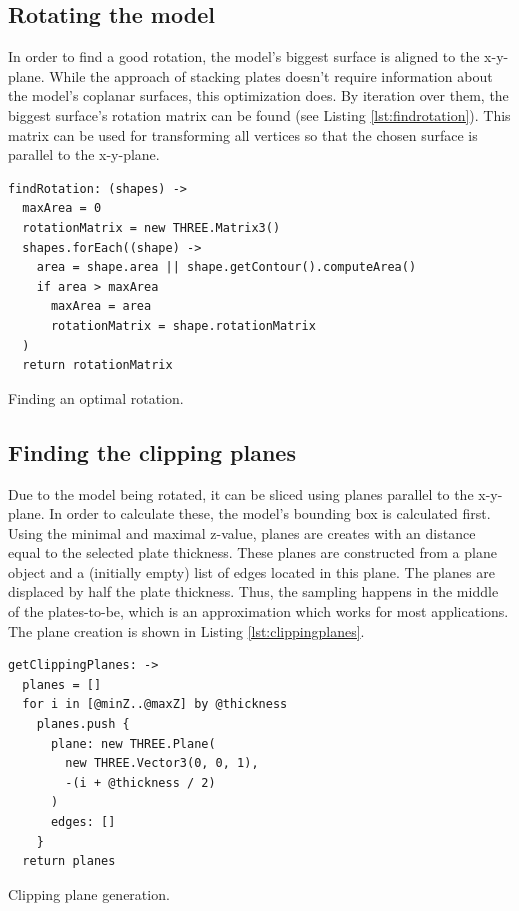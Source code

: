 \documentclass[../ClassicThesis.tex]{subfiles}
\begin{document}
\subsection{Rotating the model}

In order to find a good rotation, the model's biggest surface is aligned to the x-y-plane. While the approach of stacking plates doesn't require information about the model's coplanar surfaces, this optimization does. By iteration over them, the biggest surface's rotation matrix can be found (see Listing \ref{lst:findrotation}). This matrix can be used for transforming all vertices so that the chosen surface is parallel to the x-y-plane.

\begin{listing}[ht]
\begin{verbatim}
findRotation: (shapes) ->
  maxArea = 0
  rotationMatrix = new THREE.Matrix3()
  shapes.forEach((shape) ->
    area = shape.area || shape.getContour().computeArea()
    if area > maxArea
      maxArea = area
      rotationMatrix = shape.rotationMatrix
  )
  return rotationMatrix
\end{verbatim}
\caption{Finding an optimal rotation.}
\label{lst:findrotation}
\end{listing}

\subsection{Finding the clipping planes}

Due to the model being rotated, it can be sliced using planes parallel to the x-y-plane. In order to calculate these, the model's bounding box is calculated first. Using the minimal and maximal z-value, planes are creates with an distance equal to the selected plate thickness. These planes are constructed from a \threejs plane object and a (initially empty) list of edges located in this plane. The planes are displaced by half the plate thickness. Thus, the sampling happens in the middle of the plates-to-be, which is an approximation which works for most applications. The plane creation is shown in Listing \ref{lst:clippingplanes}.

\begin{listing}[ht]
\begin{verbatim}
getClippingPlanes: ->
  planes = []
  for i in [@minZ..@maxZ] by @thickness
    planes.push {
      plane: new THREE.Plane(
        new THREE.Vector3(0, 0, 1), 
        -(i + @thickness / 2)
      )
      edges: []
    }
  return planes
\end{verbatim}
\caption{Clipping plane generation.}
\label{lst:clippingplanes}
\end{listing}
\end{document}
